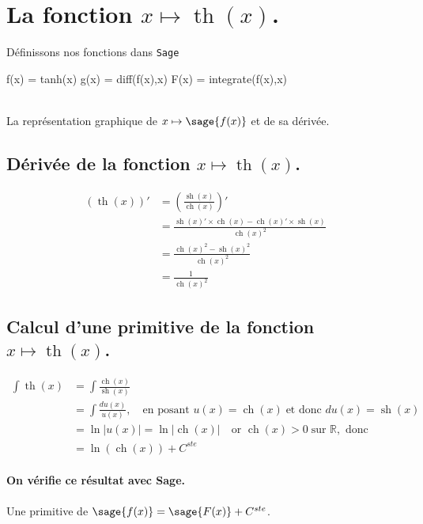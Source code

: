 \documentclass[a4paper,12pt]{report}
\def\eclaire{\mathbb}
\def\R{\ensuremath{\eclaire R}}
\renewcommand{\sinh}{\mathop{\mathrm{sh}}}
\renewcommand{\cosh}{\mathop{\mathrm{ch}}}
\renewcommand{\tanh}{\mathop{\mathrm{th}}}
\begin{document}
\section{La fonction  $x \mapsto \tanh(x)$.}

Définissons nos fonctions dans {\texttt{Sage}}
\begin{sageblock}
    f(x) = tanh(x)
    g(x) = diff(f(x),x)
    F(x) = integrate(f(x),x)
\end{sageblock}


\begin{center}
 \\
La représentation graphique de $x \mapsto \sage{f(x)} $ et de sa dérivée.
\end{center}

\subsection{Dérivée de la fonction $x \mapsto \tanh(x)$.}
\begin{align*}
(\tanh(x))' & =  \left(\frac{\sinh(x)}{\cosh(x)}\right)' \\
&  =  \frac{\sinh(x)' \times \cosh(x) - \cosh(x)' \times \sinh(x)}{\cosh(x)^2} \\ 
&  =   \frac{\cosh(x)^2 -\sinh(x)^2}{\cosh(x)^2} \\
&  =  \frac{1}{\cosh(x)^2}
\end{align*}


\subsection{Calcul d'une primitive de la fonction  $x \mapsto \tanh(x)$.}
\begin{align*}
\int \tanh(x) & = \int \frac{\cosh(x)}{\sinh(x)} \\
&  =  \int \frac{du(x)}{u(x)} , \quad \textrm{en posant } u(x) =  \cosh(x) \; \textrm{et donc } du(x) = \sinh(x) \\
&  =  \ln|u(x)| = \ln|\cosh(x)|  \quad \textrm{or } \cosh(x)>0 \; \textrm{sur } \R ,  \textrm{ donc}\\
&  =   \ln\left(\cosh(x)\right) + C^{ste} 
\end{align*}

\paragraph{On vérifie ce résultat avec Sage.}
Une primitive de $\sage{f(x)} = \sage{F(x)} + C^{ste}$.
\end{document}
